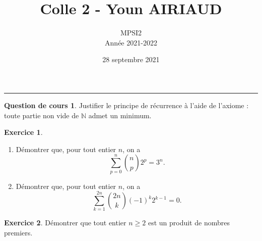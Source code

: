 \documentclass[a4paper, 11pt,openany]{article}%
\title{Colle 2 - Youn AIRIAUD}
\author{MPSI2\\
Année 2021-2022}
\date{28 septembre 2021}
\theoremstyle{plain}
\theoremstyle{definition}
\newtheorem{cours}{Question de cours}
\newtheorem{exo}{Exercice}
\newtheorem{sol}{Solution de l'exercice}
\theoremstyle{remark}
\newcommand{\N}{\mathbb{N}}
\begin{document}
   \maketitle
      \rule{\linewidth}{0.5mm}


\begin{cours}
Justifier le principe de récurrence à l'aide de l'axiome : toute partie non vide de $\N$ admet un minimum.
\end{cours}


\begin{exo}
	\begin{enumerate}
		\item Démontrer que, pour tout entier $n$, on a $$\sum_{p=0}^n\binom{n}{p}2^p = 3^n.$$
		\item Démontrer que, pour tout entier $n$, on a $$\sum_{k=1}^{2n} \binom{2n}{k}(-1)^k2^{k-1} = 0.$$
	\end{enumerate}
\end{exo}



\begin{exo}
Démontrer que tout entier $n\geqslant 2$ est un produit de nombres premiers.
\end{exo}
\end{document}
